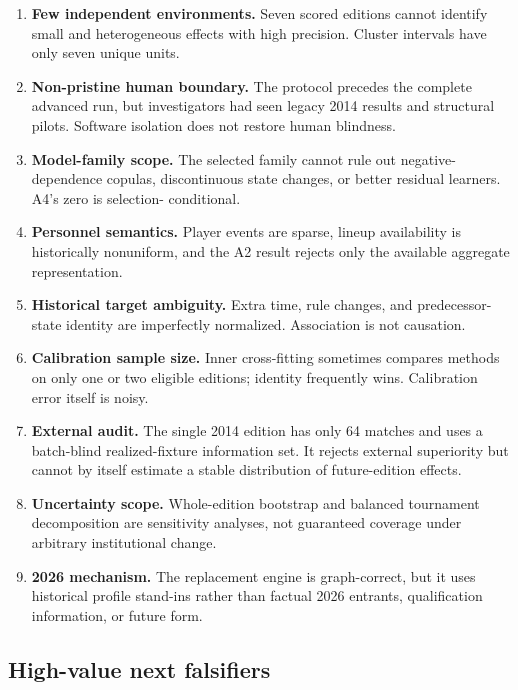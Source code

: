 \documentclass[11pt]{article}
\begin{document}
\begin{enumerate}
  \item \textbf{Few independent environments.} Seven scored editions cannot identify small and
  heterogeneous effects with high precision.  Cluster intervals have only seven unique units.
  \item \textbf{Non-pristine human boundary.} The protocol precedes the complete advanced run, but
  investigators had seen legacy 2014 results and structural pilots.  Software isolation does not
  restore human blindness.
  \item \textbf{Model-family scope.} The selected family cannot rule out negative-dependence
  copulas, discontinuous state changes, or better residual learners.  A4's zero is selection-
  conditional.
  \item \textbf{Personnel semantics.} Player events are sparse, lineup availability is historically
  nonuniform, and the A2 result rejects only the available aggregate representation.
  \item \textbf{Historical target ambiguity.} Extra time, rule changes, and predecessor-state
  identity are imperfectly normalized.  Association is not causation.
  \item \textbf{Calibration sample size.} Inner cross-fitting sometimes compares methods on only one
  or two eligible editions; identity frequently wins.  Calibration error itself is noisy.
  \item \textbf{External audit.} The single 2014 edition has only 64 matches and uses a
  batch-blind realized-fixture information set.  It rejects external superiority but cannot by
  itself estimate a stable distribution of future-edition effects.
  \item \textbf{Uncertainty scope.} Whole-edition bootstrap and balanced tournament decomposition
  are sensitivity analyses, not guaranteed coverage under arbitrary institutional change.
  \item \textbf{2026 mechanism.} The replacement engine is graph-correct, but it uses historical
  profile stand-ins rather than factual 2026 entrants, qualification information, or future form.
\end{enumerate}

\subsection{High-value next falsifiers}
\end{document}
